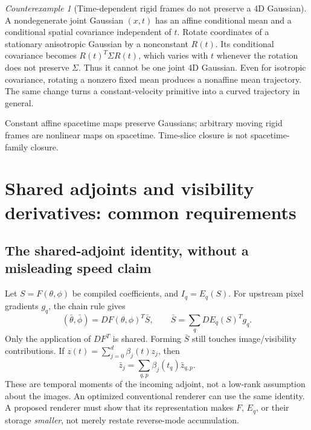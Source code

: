 \documentclass[10pt,letterpaper]{article}
\theoremstyle{remark}\newtheorem{counterexample}[proposition]{Counterexample}
\begin{document}
\begin{counterexample}[Time-dependent rigid frames do not preserve a 4D Gaussian]
A nondegenerate joint Gaussian $(x,t)$ has an affine conditional mean and a conditional spatial covariance independent of $t$. Rotate coordinates of a stationary anisotropic Gaussian by a nonconstant $R(t)$. Its conditional covariance becomes $R(t)^T\Sigma R(t)$, which varies with $t$ whenever the rotation does not preserve $\Sigma$. Thus it cannot be one joint 4D Gaussian. Even for isotropic covariance, rotating a nonzero fixed mean produces a nonaffine mean trajectory. The same change turns a constant-velocity primitive into a curved trajectory in general.
\end{counterexample}
Constant affine spacetime maps preserve Gaussians; arbitrary moving rigid frames are nonlinear maps on spacetime. Time-slice closure is not spacetime-family closure.

\section{Shared adjoints and visibility derivatives: common requirements}

\subsection{The shared-adjoint identity, without a misleading speed claim}
Let $S=F(\theta,\phi)$ be compiled coefficients, and $I_q=E_q(S)$. For upstream pixel gradients $g_q$, the chain rule gives
\begin{equation}
 (\bar\theta,\bar\phi)=DF(\theta,\phi)^T\bar S,
 \qquad \bar S=\sum_q DE_q(S)^Tg_q. \label{eq:shared}
\end{equation}
Only the application of $DF^T$ is shared. Forming $\bar S$ still touches image/visibility contributions. If $z(t)=\sum_{j=0}^d\beta_j(t)z_j$, then
\begin{equation}
 \bar z_j=\sum_{q,p}\beta_j(t_q)\bar z_{q,p}.
 \label{eq:moments}
\end{equation}
These are temporal moments of the incoming adjoint, not a low-rank assumption about the images. An optimized conventional renderer can use the same identity. A proposed renderer must show that its representation makes $F$, $E_q$, or their storage \emph{smaller}, not merely restate reverse-mode accumulation.
\end{document}
